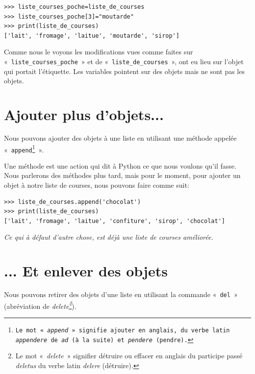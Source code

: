 \begin{Verbatim}[frame=single,rulecolor=\color{mbleu}, label=à taper]
>>> liste_courses_poche=liste_de_courses
>>> liste_courses_poche[3]="moutarde"
>>> print(liste_de_courses)
['lait', 'fromage', 'laitue', 'moutarde', 'sirop']
\end{Verbatim}

Comme nous le voyons les modifications vues comme faites sur «~\texttt{liste\_courses\_poche}~» et de «~\texttt{liste\_de\_courses}~», ont eu lieu sur l'objet qui portait l'étiquette. Les variables pointent sur des objets mais ne sont pas les objets.

\section*{Ajouter plus d'objets...}

Nous pouvons ajouter des objets à une liste en utilisant une méthode appelée «~\texttt{append\footnote{Le mot «~\emph{append}~» signifie ajouter en anglais, du verbe latin \emph{appendere} de \emph{ad} (à la suite) et \emph{pendere} (pendre).}}~».

Une méthode est une action qui dit à Python ce que nous voulons qu'il fasse. Nous parlerons des méthodes plus tard, mais pour le moment, pour ajouter un objet à notre liste de courses, nous pouvons faire comme suit:

\begin{Verbatim}[frame=single,rulecolor=\color{mbleu}, label=à taper]
>>> liste_de_courses.append('chocolat')
>>> print(liste_de_courses)
['lait', 'fromage', 'laitue', 'confiture', 'sirop', 'chocolat']
\end{Verbatim}


\emph{Ce qui à défaut d'autre chose, est déjà une liste de courses améliorée.}\\

\section*{... Et enlever des objets}
Nous pouvons retirer des objets d'une liste en utilisant la commande «~\texttt{del}~» (abréviation de \emph{delete\footnote{Le mot «~\emph{delete}~» signifier détruire ou effacer en anglais du participe passé \emph{deletus} du verbe latin \emph{delere} (détruire).}}).

